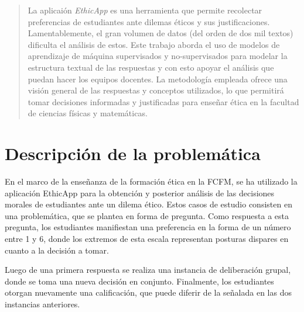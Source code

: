 \documentclass[
	spanish, %
	letterpaper, oneside
]{article}
\begin{document}
	
\templatePagecfg


\templateFinalcfg


\inserttitle

\begin{abstract}
    La aplicaión \textit{EthicApp} es una herramienta que permite recolectar preferencias de estudiantes ante dilemas éticos y sus justificaciones. Lamentablemente, el gran volumen de datos (del orden de dos mil textos) dificulta el análisis de estos. Este trabajo aborda el uso de modelos de aprendizaje de máquina supervisados y no-supervisados para modelar la estructura textual de las respuestas y con esto apoyar el análisis que puedan hacer los equipos docentes. La metodología empleada ofrece una visión general de las respuestas y conceptos utilizados, lo que permitirá tomar decisiones informadas y justificadas para enseñar ética en la facultad de ciencias físicas y matemáticas.
\end{abstract}


\section{Descripción de la problemática}

En el marco de la enseñanza de la formación ética en la FCFM, se ha utilizado la aplicación EthicApp para la obtención y posterior análisis de las decisiones morales de estudiantes ante un dilema ético. Estos casos de estudio consisten en una problemática, que se plantea en forma de pregunta. Como respuesta a esta pregunta, los estudiantes manifiestan una preferencia en la forma de un número entre 1 y 6, donde los extremos de esta escala representan posturas dispares en cuanto a la decisión a tomar.


Luego de una primera respuesta se realiza una instancia de deliberación grupal, donde se toma una nueva decisión en conjunto. Finalmente, los estudiantes otorgan nuevamente una calificación, que puede diferir de la señalada en las dos instancias anteriores.

\end{document}
